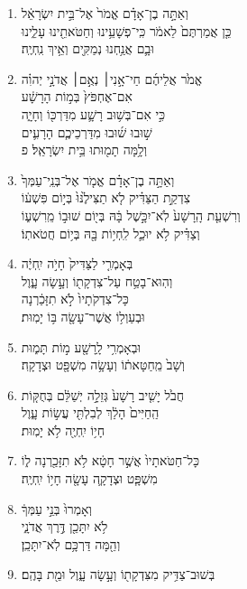 \documentclass[12pt,a4paper,titlepage]{article}
\def \pslabelsep{-0.9em} %
\def \psleftmargin{0em} %
\begin{document}
\begin{enumerate}[leftmargin=\psleftmargin, labelsep = \pslabelsep, label={\arabic*}, font=\color{\pscolor}\small\textsuperscript, parsep=0em, itemsep=0em, topsep=0em ]
\item \texthebrew{וְאַתָּ֣ה בֶן־אָדָ֗ם אֱמֹר֙ אֶל־בֵּ֣ית יִשְׂרָאֵ֔ל \\ כֵּ֤ן אֲמַרְתֶּם֙ לֵאמֹ֔ר כִּֽי־פְשָׁעֵ֥ינוּ וְחַטֹּאתֵ֖ינוּ עָלֵ֑ינוּ \\ וּבָ֛ם אֲנַ֥חְנוּ נְמַקִּ֖ים וְאֵ֥יךְ נִֽחְיֶֽה׃}
\item \texthebrew{אֱמֹ֙ר אֲלֵיהֶ֜ם חַי־אָ֣נִי׀ נְאֻ֣ם׀ אֲדֹנָ֣י יְהוִ֗ה \\ אִם־אֶחְפֹּץ֙ בְּמ֣וֹת הָרָשָׁ֔ע \\ כִּ֣י אִם־בְּשׁ֥וּב רָשָׁ֛ע מִדַּרְכּ֖וֹ וְחָיָ֑ה \\ שׁ֣וּבוּ שׁ֜וּבוּ מִדַּרְכֵיכֶ֧ם הָרָעִ֛ים \\ וְלָ֥מָּה תָמ֖וּתוּ בֵּ֥ית יִשְׂרָאֵֽל׃ פ}\verseSpace
\item \texthebrew{וְאַתָּ֣ה בֶן־אָדָ֗ם אֱמֹ֤ר אֶל־בְּנֵֽי־עַמְּךָ֙ \\ צִדְקַ֣ת הַצַּדִּ֗יק לֹ֤א תַצִּילֶ֙נּוּ֙ בְּי֣וֹם פִּשְׁע֔וֹ \\ וְרִשְׁעַ֤ת הָֽרָשָׁע֙ לֹֽא־יִכָּ֣שֶׁל בָּ֔הּ בְּי֖וֹם שׁוּב֣וֹ מֵֽרִשְׁע֑וֹ \\ וְצַדִּ֗יק לֹ֥א יוּכַ֛ל לִֽחְי֥וֹת בָּ֖הּ בְּי֥וֹם חֲטֹאתֽוֹ׃}
\item \texthebrew{בְּאָמְרִ֤י לַצַּדִּיק֙ חָיֹ֣ה יִֽחְיֶ֔ה \\ וְהֽוּא־בָטַ֥ח עַל־צִדְקָת֖וֹ וְעָ֣שָׂה עָ֑וֶל \\ כָּל־צִדְקֹתָיו֙ לֹ֣א תִזָּכַ֔רְנָה \\ וּבְעַוְל֥וֹ אֲשֶׁר־עָשָׂ֖ה בּ֥וֹ יָמֽוּת׃}
\item \texthebrew{וּבְאָמְרִ֥י לָֽרָשָׁ֖ע מ֣וֹת תָּמ֑וּת \\ וְשָׁב֙ מֵֽחַטָּאת֔וֹ וְעָשָׂ֥ה מִשְׁפָּ֖ט וּצְדָקָֽה׃}
\item \texthebrew{חֲבֹ֙ל יָשִׁ֤יב רָשָׁע֙ גְּזֵלָ֣ה יְשַׁלֵּ֔ם בְּחֻקּ֤וֹת \\ הַֽחַיִּים֙ הָלַ֔ךְ לְבִלְתִּ֖י עֲשׂ֣וֹת עָ֑וֶל \\ חָי֥וֹ יִֽחְיֶ֖ה לֹ֥א יָמֽוּת׃}
\item \texthebrew{כָּל־חַטֹּאתָיו֙ אֲשֶׁ֣ר חָטָ֔א לֹ֥א תִזָּכַ֖רְנָה ל֑וֹ \\ מִשְׁפָּ֧ט וּצְדָקָ֛ה עָשָׂ֖ה חָי֥וֹ יִֽחְיֶֽה׃}\verseSpace
\item \texthebrew{וְאָמְרוּ֙ בְּנֵ֣י עַמְּךָ֔ \\ לֹ֥א יִתָּכֵ֖ן דֶּ֣רֶךְ אֲדֹנָ֑י \\ וְהֵ֖מָּה דַּרְכָּ֥ם לֹֽא־יִתָּכֵֽן׃}
\item \texthebrew{בְּשׁוּב־צַדִּ֥יק מִצִּדְקָת֖וֹ וְעָ֣שָׂה עָ֑וֶל וּמֵ֖ת בָּהֶֽם׃}

\end{enumerate}
\end{document}
